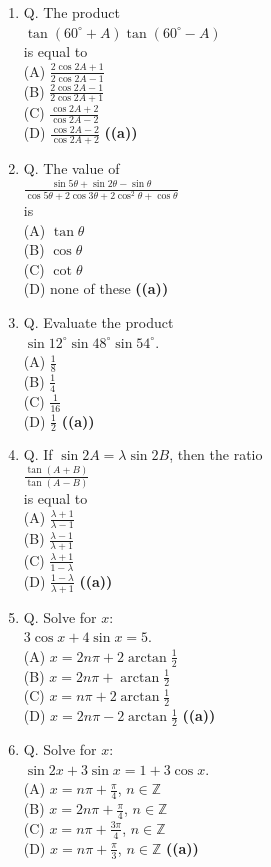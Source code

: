 \documentclass{article}
\begin{document}
\begin{enumerate}
\item Q. The product \\ $\tan(60^\circ + A) \tan(60^\circ - A)$ \\ is equal to \\ (A) $\frac{2 \cos 2A + 1}{2 \cos 2A-1}$ \\ (B) $\frac{2 \cos 2A-1}{2 \cos 2A + 1}$ \\ (C) $\frac{\cos 2A + 2}{\cos 2A - 2}$ \\ (D) $\frac{\cos 2A - 2}{\cos 2A + 2}$ \hfill \textbf{((a))}
\item Q. The value of \\ $\frac{\sin 5\theta+ \sin 2\theta - \sin \theta}{\cos 5\theta + 2 \cos 3\theta + 2 \cos^2 \theta + \cos \theta}$ \\ is \\ (A) $\tan\theta$ \\ (B) $\cos \theta$ \\ (C) $\cot \theta$ \\ (D) none of these \hfill \textbf{((a))}
\item Q. Evaluate the product \\ $\sin 12^\circ \sin 48^\circ \sin 54^\circ$. \\ (A) $\frac{1}{8}$ \\ (B) $\frac{1}{4}$ \\ (C) $\frac{1}{16}$ \\ (D) $\frac{1}{2}$ \hfill \textbf{((a))}
\item Q. If $\sin 2A = \lambda \sin 2B$, then the ratio \\ $\frac{\tan(A + B)}{\tan(A - B)}$ \\ is equal to \\ (A) $\frac{\lambda+1}{\lambda-1}$ \\ (B) $\frac{\lambda-1}{\lambda+1}$ \\ (C) $\frac{\lambda+1}{1-\lambda}$ \\ (D) $\frac{1-\lambda}{\lambda+1}$ \hfill \textbf{((a))}
\item Q. Solve for $x$: \\ $3 \cos x + 4 \sin x = 5$. \\ (A) $x = 2n\pi + 2 \arctan\frac{1}{2}$ \\ (B) $x = 2n\pi + \arctan\frac{1}{2}$ \\ (C) $x = n\pi + 2 \arctan\frac{1}{2}$ \\ (D) $x = 2n\pi - 2 \arctan\frac{1}{2}$ \hfill \textbf{((a))}
\item Q. Solve for $x$: \\ $\sin 2x + 3 \sin x = 1 + 3 \cos x$. \\ (A) $x = n\pi + \frac{\pi}{4}$, $n \in \mathbb{Z}$ \\ (B) $x = 2n\pi + \frac{\pi}{4}$, $n \in \mathbb{Z}$ \\ (C) $x = n\pi + \frac{3\pi}{4}$, $n \in \mathbb{Z}$ \\ (D) $x = n\pi + \frac{\pi}{3}$, $n \in \mathbb{Z}$ \hfill \textbf{((a))}

\end{enumerate}
\end{document}
